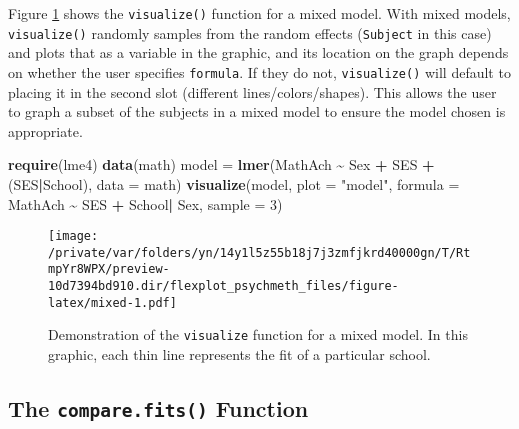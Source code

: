 \documentclass[
  english,
  man]{apa6}
\newenvironment{Shaded}{\begin{snugshade}}{\end{snugshade}}
\newcommand{\DataTypeTok}[1]{\textcolor[rgb]{0.13,0.29,0.53}{#1}}
\newcommand{\DecValTok}[1]{\textcolor[rgb]{0.00,0.00,0.81}{#1}}
\newcommand{\KeywordTok}[1]{\textcolor[rgb]{0.13,0.29,0.53}{\textbf{#1}}}
\newcommand{\NormalTok}[1]{#1}
\newcommand{\OperatorTok}[1]{\textcolor[rgb]{0.81,0.36,0.00}{\textbf{#1}}}
\newcommand{\StringTok}[1]{\textcolor[rgb]{0.31,0.60,0.02}{#1}}
\begin{document}
\normalsize

Figure \ref{fig:mixed} shows the \texttt{visualize()} function for a mixed model. With mixed models, \texttt{visualize()} randomly samples from the random effects (\texttt{Subject} in this case) and plots that as a variable in the graphic, and its location on the graph depends on whether the user specifies \texttt{formula}. If they do not, \texttt{visualize()} will default to placing it in the second slot (different lines/colors/shapes). This allows the user to graph a subset of the subjects in a mixed model to ensure the model chosen is appropriate.

\small

\begin{Shaded}
\begin{Highlighting}[]
\KeywordTok{require}\NormalTok{(lme4)}
\KeywordTok{data}\NormalTok{(math)}
\NormalTok{model =}\StringTok{ }\KeywordTok{lmer}\NormalTok{(MathAch }\OperatorTok{\textasciitilde{}}\StringTok{ }\NormalTok{Sex }\OperatorTok{+}\StringTok{ }\NormalTok{SES }\OperatorTok{+}\StringTok{ }\NormalTok{(SES}\OperatorTok{|}\NormalTok{School), }\DataTypeTok{data =}\NormalTok{ math)}
\KeywordTok{visualize}\NormalTok{(model, }
  \DataTypeTok{plot =} \StringTok{"model"}\NormalTok{,}
  \DataTypeTok{formula =}\NormalTok{ MathAch }\OperatorTok{\textasciitilde{}}\StringTok{  }\NormalTok{SES }\OperatorTok{+}\StringTok{ }\NormalTok{School}\OperatorTok{|}\StringTok{ }\NormalTok{Sex, }
  \DataTypeTok{sample =} \DecValTok{3}\NormalTok{)}
\end{Highlighting}
\end{Shaded}

\begin{figure}
\centering
\texttt{[image: /private/var/folders/yn/14y1l5z55b18j7j3zmfjkrd40000gn/T/RtmpYr8WPX/preview-10d7394bd910.dir/flexplot\_psychmeth\_files/figure-latex/mixed-1.pdf]}
\caption{\label{fig:mixed}Demonstration of the \texttt{visualize} function for a mixed model. In this graphic, each thin line represents the fit of a particular school. \label{fig:mixed}}
\end{figure}

\normalsize

\hypertarget{the-compare.fits-function}{%
\subsection{\texorpdfstring{The \texttt{compare.fits()} Function}{The compare.fits() Function}}\label{the-compare.fits-function}}
\end{document}

